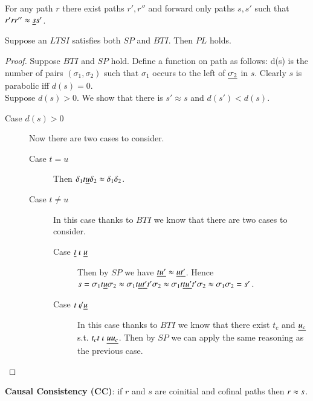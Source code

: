 

\begin{definition}
  For any path $r$ there exist paths $r',r''$ and forward only paths $s,s'$ such that $r'rr'' \approx \underline{s}s'$.
\end{definition}

\begin{proposition}
  Suppose an $LTSI$ satisfies both $SP$ and $BTI$. Then $PL$ holds.
\end{proposition}
\begin{proof}
  Suppose $BTI$ and $SP$ hold. Define a function on path as follows: d(s) is the
  number of pairs $(\sigma_1,\sigma_2)$ such that $\sigma_1$ occurs to the left of $\underline{\sigma_2}$ in $s$.
  Clearly $s$ is parabolic iff $d(s)=0$. \\

  Suppose $d(s)>0$. We show that there is $s' \approx s$ and $d(s') < d(s)$.
  \begin{description}
  \item[Case $d(s)>0$] Now there are two cases to consider.
    \begin{description}
    \item[Case $t = u$] Then $\delta_1 t\underline{u}\delta_2 \approx
      \delta_1\delta_2$.
    \item[Case $t \neq u$] In this case thanks to $BTI$ we know that there are
      two cases to consider.
      \begin{description}
      \item[Case $\underline{t} \mathrel{\iota} \underline{u}$] Then by $SP$ we have $\underline{t}\underline{u'}
        \approx \underline{u}\underline{t'}$. Hence $s= \sigma_1t\underline{u}\sigma_2 \approx
        \sigma_1 t\underline{u}\underline{t'}t'\sigma_2 \approx \sigma_1
        t\underline{t}\underline{u'}t'\sigma_2 \approx \sigma_1 \sigma_2=s'$.
        
      \item[Case $t \not\mathrel{\iota} \underline{u}$] In this case thanks to $BTI$ we know that
        there exist $t_c$ and $\underline{u_c}$ s.t. $t_ct \mathrel{\iota} \underline{uu_c}$. Then by
        $SP$ we can apply the same reasoning as the previous case.
        
      \end{description}
    \end{description}
  \end{description}
  
\end{proof}

\begin{definition}\label{def:cc}
  {\bf Causal Consistency (CC)}: if $r$ and $s$ are coinitial and cofinal paths then $r \approx s$.
\end{definition}

